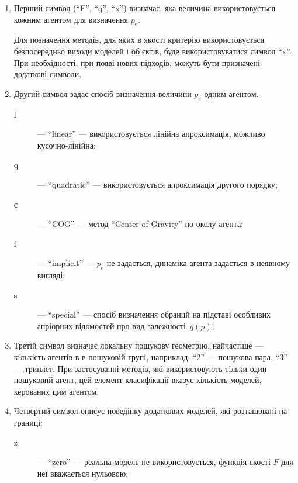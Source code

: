 \begin{enumerate}

  \item
    Перший символ (``F'', ``q'', ``x'') визначає,
    яка величина використовується кожним агентом для визначення $p_e$.

    Для позначення методів, для яких в якості критерію
    використовується безпосередньо виходи моделей і об'єктів, буде
    використовуватися символ ``x''. При необхідності, при появі нових
    підходів, можуть бути призначені додаткові символи.

  \item
    Другий символ
    задає спосіб визначення величини $p_e$ одним агентом.

    \begin{description}

      \item[l]  --- ``linear'' ---
        використовується лінійна апроксимація, можливо кусочно-лінійна;

      \item[q]  --- ``quadratic'' ---
        використовується апроксимація другого порядку;

      \item[с] --- ``COG'' ---
        метод ``Center of Gravity'' по околу агента;

      \item[i] --- ``implicit'' ---
       $p_e$ не задається, динаміка агента задається в неявному вигляді;

      \item[s] --- ``special'' ---
        спосіб визначення обраний на підставі особливих апріорних
        відомостей про вид залежності~$q(p)$;

    \end{description}

  \item
    Третій символ визначає локальну пошукову геометрію, найчастіше --- кількість
    агентів в в пошуковій групі, наприклад: ``2'' --- пошукова пара, ``3'' --- триплет.
    При застосуванні методів, які використовують тільки один
    пошуковий агент, цей елемент класифікації вказує кількість
    моделей, керованих цим агентом.

  \item
    Четвертий символ
    описує поведінку додаткових моделей, які розташовані на границі:
    \begin{description}

      \item[z]  --- ``zero'' ---
        реальна модель не використовується, функція якості
        $F$ для неї вважається нульовою;


\end{description}
\end{enumerate}
